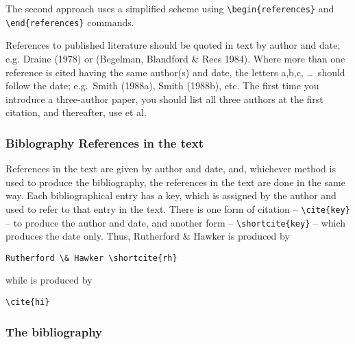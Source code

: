 \documentclass{gji}
\begin{document}
The second approach uses a simplified scheme using
\verb"\begin{references}" and \verb"\end{references}" commands.

References to published literature should be quoted in text by author
and date; e.g. Draine (1978) or (Begelman, Blandford \& Rees 1984).
Where more than one reference is cited having the same author(s) and date,
the letters a,b,c, \ldots\ should follow the date; e.g.\ Smith (1988a),
Smith (1988b), etc.
The first time you introduce a three-author paper, you should list all
three authors at the first citation, and thereafter, use et al.

%
%  

\subsubsection{Biblography References in the text}

References in the text are given by author and date, and, whichever
method is used to produce the bibliography, the references in the text
are done in the same way. Each bibliographical entry has a key, which
is assigned by the author and used to refer to that entry in the text.
There is one form of citation -- \verb"\cite{key}" -- to produce the
author and date, and another form -- \verb"\shortcite{key}" -- which
produces the date only. Thus, Rutherford \& Hawker  is
produced by
\begin{verbatim}
Rutherford \& Hawker \shortcite{rh}
\end{verbatim}
while \cite{hi} is produced by
\begin{verbatim}
\cite{hi}
\end{verbatim}

\subsubsection{The bibliography}
\end{document}
